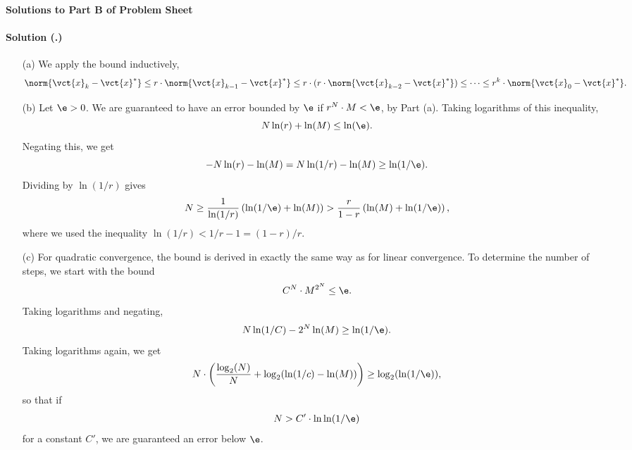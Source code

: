\documentclass{article}
\newcounter{problemSheetNumber}
\newcounter{problems}
\renewcommand{\solution}[1]{\paragraph{Solution (\theproblemSheetNumber.\theproblems)}\addtocounter{problems}{1}\label{#1}}
\begin{document}
 
\begin{center}
{\Large {\bf Solutions to Part B of Problem Sheet \theproblemSheetNumber}}
\end{center}

\solution{pr:4}
\begin{itemize}
 \item[(a)] We apply the bound inductively,
 \begin{equation*}
  \norm{\vct{x}_k-\vct{x}^*}\leq r\cdot \norm{\vct{x}_{k-1}-\vct{x}^*}\leq r \cdot (r \cdot  \norm{\vct{x}_{k-2}-\vct{x}^*})\leq \cdots \leq r^k\cdot \norm{\vct{x}_{0}-\vct{x}^*}.
 \end{equation*}
\item[(b)] Let $\e>0$. We are guaranteed to have an error bounded by $\e$ if $r^N\cdot M<\e$, by Part (a).
Taking logarithms of this inequality,
\begin{equation*}
 N\ln(r) + \ln(M)\leq \ln(\e).
\end{equation*}
Negating this, we get
\begin{equation*}
 -N\ln(r) - \ln(M)=N\ln(1/r) - \ln(M)\geq \ln(1/\e).
\end{equation*}
Dividing by $\ln(1/r)$ gives
\begin{equation*}
 N  \geq \frac{1}{\ln(1/r)} \left(\ln(1/\e)+\ln(M)\right) > \frac{r}{1-r}\left(\ln(M)+\ln(1/\e)\right),
\end{equation*}
where we used the inequality $\ln(1/r)<1/r-1 = (1-r)/r$. 
\item[(c)] For quadratic convergence, the bound is derived in exactly the same way as for linear convergence. To determine the number of steps, we start with the bound
\begin{equation*}
 C^N\cdot M^{2^N}\leq \e.
\end{equation*}
Taking logarithms and negating,
\begin{equation*}
 N\ln(1/C)-2^N\ln(M) \geq \ln(1/\e).
\end{equation*}
Taking logarithms again, we get
\begin{equation*}
 N\cdot \left(\frac{\log_2(N)}{N}+\log_2(\ln(1/c)-\ln(M))\right) \geq \log_2 (\ln(1/\e)),
\end{equation*}
so that if 
\begin{equation*}
 N> C'\cdot \ln\ln(1/\e)
\end{equation*}
for a constant $C'$, we are guaranteed an error below $\e$.

\end{itemize}
\end{document}
